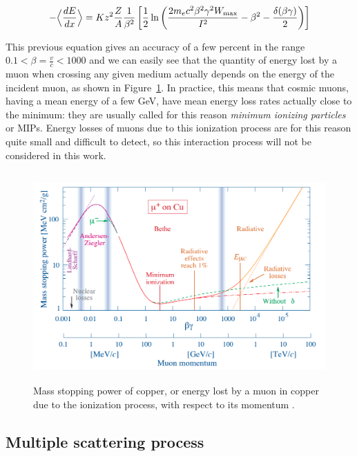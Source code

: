 \documentclass[a4paper, 11pt]{report}
\begin{document}
\begin{equation}
\label{eq:BB}
- \Bigl \langle \frac{dE}{dx} \Bigr \rangle = K z^2 \frac{Z}{A} \frac{1}{\beta^2} \left [\frac{1}{2} \ln \left (\frac{2 m_e c^2 \beta^2 \gamma^2 W_{\text{max}}}{I^2} - \beta^2 - \frac{\delta(\beta \gamma)}{2} \right ) \right ]
\end{equation}

This previous equation gives an accuracy of a few percent in the range $0.1 < \beta = \frac{v}{c} < 1000$ and we can easily see that the quantity of energy lost by a muon when crossing any given medium actually depends on the energy of the incident muon, as shown in Figure~\ref{figure:BB}. In practice, this means that cosmic muons, having a mean energy of a few GeV, have mean energy loss rates actually close to the minimum: they are usually called for this reason \textit{minimum ionizing particles} or MIPs. Energy losses of muons due to this ionization process are for this reason quite small and difficult to detect, so this interaction process will not be considered in this work.

\begin{figure}[htbp]
\begin{center}
\includegraphics[width=12cm, height=8cm]{figs/BB.png}
\caption{Mass stopping power of copper, or energy lost by a muon in copper due to the ionization process, with respect to its momentum \cite{PDGMuons}.}
\label{figure:BB}
\end{center}
\end{figure}

\subsection{Multiple scattering process}
\end{document}
